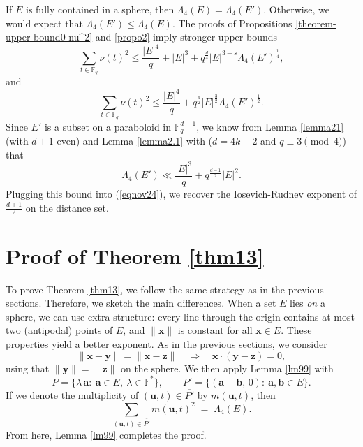 \documentclass[11pt]{article}
\begin{document}
If $E$ is fully contained in a sphere, then $\Lambda_4(E)=\Lambda_4(E')$. Otherwise, we would expect that $\Lambda_4(E')\le \Lambda_4(E)$. The proofs of Propositions \ref{theorem-upper-bound0-nu^2} and \ref{propo2} imply stronger upper bounds 
  \[\sum_{t\in \mathbb{F}_q}\nu(t)^2\le \frac{|E|^4}{q}+|E|^3+q^{\frac{d}{4}}|E|^{3-s}\Lambda_4(E')^{\frac{1}{4}},\]
  and
 \begin{equation}\label{eqnov24}\sum_{t\in \mathbb{F}_q}\nu(t)^2\le \frac{|E|^4}{q}+q^{\frac{d}{2}}|E|^{\frac{3}{2}}\Lambda_4(E')^{\frac{1}{2}}.\end{equation}
Since $E'$ is a subset on a paraboloid in $\mathbb{F}_q^{d+1}$, we know from Lemma \ref{lemma21} (with $d+1$ even) and Lemma \ref{lemma2.1} with ($d=4k-2$ and $q\equiv 3\pmod 4$) that 
\[\Lambda_4(E')\ll \frac{|E|^3}{q}+q^{\frac{d-1}{2}}|E|^2.\]
Plugging this bound into (\ref{eqnov24}), we recover the Iosevich-Rudnev exponent of $\frac{d+1}{2}$ on the distance set. 


\section{Proof of Theorem \ref{thm13}}\label{sec5}
To prove Theorem \ref{thm13}, we follow the same strategy as in the previous sections. Therefore, we sketch the main differences. When a set \(E\) lies \emph{on} a sphere, we can use extra structure: every line through the origin contains at most two (antipodal) points of \(E\), and \(\|\mathbf{x}\|\) is constant for all \(\mathbf{x}\in E\). These properties yield a better exponent. As in the previous sections, we consider
\[
\|\mathbf{x}-\mathbf{y}\|=\|\mathbf{x}-\mathbf{z}\| \quad\Longrightarrow\quad \mathbf{x}\cdot(\mathbf{y}-\mathbf{z})=0,
\]
using that \(\|\mathbf{y}\|=\|\mathbf{z}\|\) on the sphere. We then apply Lemma \ref{lm99} with
\[
P=\{\lambda\,\mathbf{a}:\ \mathbf{a}\in E,\ \lambda\in\mathbb{F}^{*}\},
\qquad
P'=\{(\mathbf{a}-\mathbf{b},\,0):\ \mathbf{a},\mathbf{b}\in E\}.
\]
If we denote the multiplicity of $(\mathbf{u}, t)\in \overline{P'}$ by $m(\mathbf{u}, t)$, then
\[
\sum_{(\mathbf{u},t)\in \overline{P'}} m(\mathbf{u},t)^{2}
\;=\;
\Lambda_4(E).
\]
From here, Lemma \ref{lm99} completes the proof.


\end{document}
